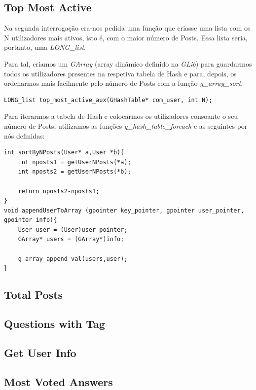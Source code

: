 \documentclass[a4paper, 11pt, oneside]{article}
\begin{document}
\subsection{Top Most Active}
Na segunda interrogação era-nos pedida uma função que criasse uma lista com os N utilizadores mais ativos, isto é, com o maior número de Posts. Essa lista seria, portanto, uma \textit{LONG\_list}.

Para tal, criamos um \textit{GArray} (array dinâmico definido na \textit{GLib}) para guardarmos todos os utilizadores presentes na respetiva tabela de Hash e para, depois, os ordenarmos mais facilmente pelo número de Posts com a função \textit{g\_array\_sort}.
\begin{lstlisting}[caption=Tipo da função auxiliar da Query 2]
LONG_list top_most_active_aux(GHashTable* com_user, int N);
\end{lstlisting}

Para iterarmos a tabela de Hash e colocarmos os utilizadores consoante o seu número de Posts, utilizamos as funções \textit{g\_hash\_table\_foreach} e as seguintes por nós definidas:
\begin{lstlisting}[caption=Funções auxiliares utilizadas na Query 2]
int sortByNPosts(User* a,User *b){
	int nposts1 = getUserNPosts(*a);
	int nposts2 = getUserNPosts(*b);
	
	return nposts2-nposts1;
}
void appendUserToArray (gpointer key_pointer, gpointer user_pointer, gpointer info){	
	User user = (User)user_pointer;
	GArray* users = (GArray*)info;

	g_array_append_val(users,user);
}
\end{lstlisting}

\subsection{Total Posts}

\subsection{Questions with Tag}

\subsection{Get User Info}

\subsection{Most Voted Answers}
\end{document}
